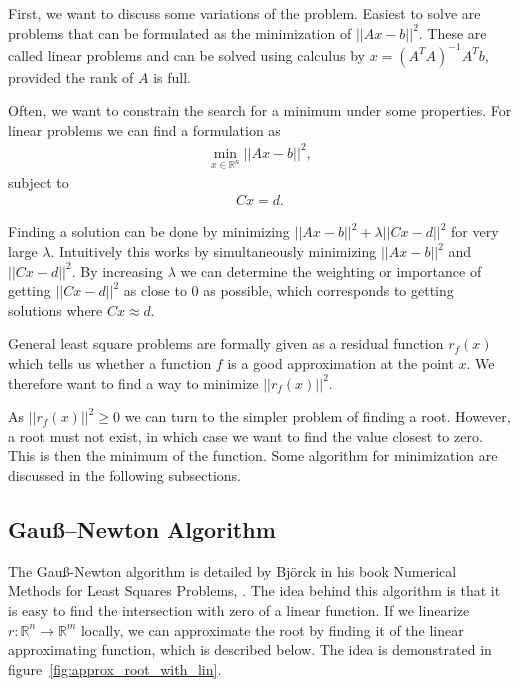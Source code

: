 First, we want to discuss some variations of the problem. Easiest to solve are problems that can be formulated as the minimization of $||Ax - b||^2$. These are called linear problems and can be solved using calculus by $x=(A^TA)^{-1}A^Tb$, provided the rank of $A$ is full.

\newpage
\noindent
Often, we want to constrain the search for a minimum under some properties. For linear problems we can find a formulation as
\begin{align*}
	\min_{x \in \mathds{R}^n} ||Ax-b||^2,
\end{align*}
subject to
\begin{align*}
	Cx=d.
\end{align*}

\noindent
Finding a solution can be done by minimizing $||Ax-b||^2 + \lambda ||Cx-d||^2$ for very large $\lambda$. Intuitively this works by simultaneously minimizing $||Ax-b||^2$ and $||Cx-d||^2$. By increasing $\lambda$ we can determine the weighting or importance of getting $||Cx-d||^2$ as close to $0$ as possible, which corresponds to getting solutions where $Cx \approx d$.

General least square problems are formally given as a residual function $r_f(x)$ which tells us whether a function $f$ is a good approximation at the point $x$. We therefore want to find a way to minimize $||r_f(x)||^2$.

As $||r_f(x)||^2 \geq 0$ we can turn to the simpler problem of finding a root. However, a root must not exist, in which case we want to find the value closest to zero. This is then the minimum of the function.
Some algorithm for minimization are discussed in the following subsections.

\subsection{Gauß–Newton Algorithm}

The Gauß-Newton algorithm is detailed by Björck in his book Numerical Methods for Least Squares Problems, \cite{Bjoerck1996}.
The idea behind this algorithm is that it is easy to find the intersection with zero of a linear function. If we linearize $r\colon\mathds{R}^n \rightarrow \mathds{R}^m$ locally, we can approximate the root by finding it of the linear approximating function, which is described below. The idea is demonstrated in figure~\ref{fig:approx_root_with_lin}.

